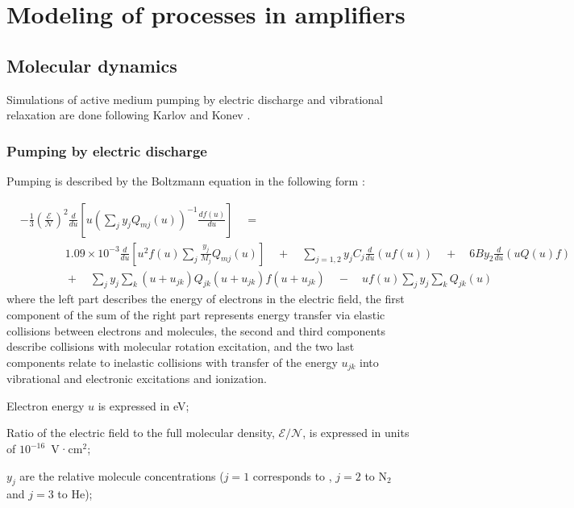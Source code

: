 \chapter{Modeling of processes in \texorpdfstring{}{CO2} amplifiers}\label{chapter:models}

\section{Molecular dynamics}
Simulations of active medium pumping by electric discharge and vibrational relaxation are done following Karlov and Konev  \cite{Karlov-1978}.

\subsection{Pumping by electric discharge}
Pumping is described by the Boltzmann equation in the following form \cite{Holstein-1946,Nighan-1970}:

\begin{align}\label{eq:boltzmann}
&- \frac{1}{3} \left(\frac{\mathcal{E}}{\mathcal{N}}\right)^2 \frac{d}{du} \left[u \left( \sum\limits_j y_j Q_{mj}(u) \right)^{-1}\frac{df(u)}{du} \right] \quad = \nonumber \\
&\qquad \qquad 1.09 \times 10^{ - 3}\frac{d}{du}\left[ u^2 f(u)\sum\limits_j \frac{y_j}{M_j} Q_{mj}(u) \right]
\quad  + \quad \sum\limits_{j = 1,2} {y_j}{C_j} \frac{d}{du}(uf(u))
\quad  + \quad 6B y_2 \frac{d}{du}\left(uQ(u)f \right)\nonumber \\
&\qquad \qquad +\quad\sum\limits_j y_j \sum\limits_k (u + u_{jk})Q_{jk} (u + u_{jk})f(u + u_{jk}) \quad  - \quad uf(u)\sum\limits_j y_j \sum\limits_k Q_{jk}(u)
\end{align}
where the left part describes the energy of electrons in the electric field, the first component of the sum of the right part represents energy transfer via elastic collisions between electrons and molecules, the second and third components describe collisions with molecular rotation excitation, and the two last components relate to inelastic collisions with transfer of the energy $u_{jk}$ into vibrational and electronic excitations and ionization.

Electron energy $u$ is expressed in eV;

Ratio of the electric field to the full molecular density, $\mathcal{E}/\mathcal{N}$, is expressed in units of $10^{-16}$~V·cm$^2$;

$y_j$ are the relative molecule concentrations ($j=1$ corresponds to , $j=2$ to N$_2$ and $j=3$ to He);

